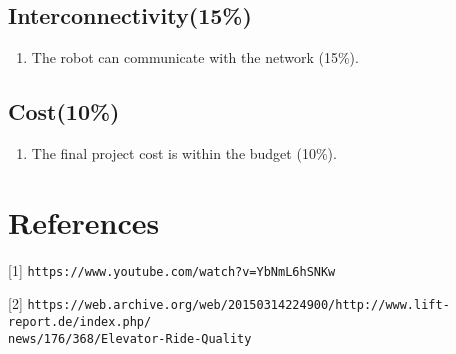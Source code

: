 \documentclass[12pt]{article}
\begin{document}
	\subsection{Interconnectivity(15\%)}
		\begin{enumerate}
			\item The robot can communicate with the network (15\%).
		\end{enumerate}
	
	\subsection{Cost(10\%)}
		\begin{enumerate}
			\item The final project cost is within the budget (10\%).
		\end{enumerate}
	
\section{References}
[1] \texttt{https://www.youtube.com/watch?v=YbNmL6hSNKw}

[2]	\texttt{https://web.archive.org/web/20150314224900/http://www.lift-report.de/index.php/\\news/176/368/Elevator-Ride-Quality}
	
\end{document}
